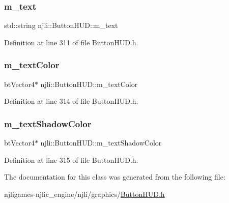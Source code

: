 \subsubsection{\texorpdfstring{m\+\_\+text}{m\_text}}
{\footnotesize\ttfamily std\+::string njli\+::\+Button\+H\+U\+D\+::m\+\_\+text\hspace{0.3cm}{\ttfamily [private]}}



Definition at line 311 of file Button\+H\+U\+D.\+h.

\mbox{\label{classnjli_1_1_button_h_u_d_ac2561e2838776df33d2c0eff6aa3e145}} 
\subsubsection{\texorpdfstring{m\+\_\+text\+Color}{m\_textColor}}
{\footnotesize\ttfamily bt\+Vector4$\ast$ njli\+::\+Button\+H\+U\+D\+::m\+\_\+text\+Color\hspace{0.3cm}{\ttfamily [private]}}



Definition at line 314 of file Button\+H\+U\+D.\+h.

\mbox{\label{classnjli_1_1_button_h_u_d_a2acbd93bdfa31be57d9a00fdd411e735}} 
\subsubsection{\texorpdfstring{m\+\_\+text\+Shadow\+Color}{m\_textShadowColor}}
{\footnotesize\ttfamily bt\+Vector4$\ast$ njli\+::\+Button\+H\+U\+D\+::m\+\_\+text\+Shadow\+Color\hspace{0.3cm}{\ttfamily [private]}}



Definition at line 315 of file Button\+H\+U\+D.\+h.



The documentation for this class was generated from the following file\+:\begin{DoxyCompactItemize}
\item 
njligames-\/njlic\+\_\+engine/njli/graphics/\mbox{\hyperlink{_button_h_u_d_8h}{Button\+H\+U\+D.\+h}}\end{DoxyCompactItemize}
